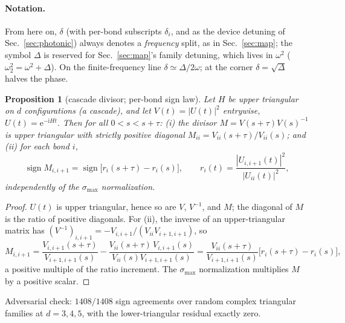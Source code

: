 ﻿\documentclass[11pt]{article}
\newcommand{\ee}{\mathrm{e}}
\newcommand{\ii}{\mathrm{i}}
\newtheorem{proposition}{Proposition}
\theoremstyle{remark}
\begin{document}
\paragraph{Notation.} From here on, $\delta$ (with per-bond
subscripts $\delta_i$, and as the device detuning of
Sec.~\ref{sec:photonic}) always denotes a \emph{frequency} split,
as in Sec.~\ref{sec:map}; the symbol $\Delta$ is reserved for
Sec.~\ref{sec:map}'s family detuning, which lives in $\omega^2$
($\omega_2^2=\omega^2+\Delta$). On the finite-frequency line
$\delta\simeq\Delta/2\omega$; at the corner $\delta=\sqrt\Delta$
halves the phase.

\begin{proposition}[cascade divisor; per-bond sign law]
\label{prop:signlaw}
Let $H$ be upper triangular on $d$ configurations (a cascade), and
let $V(t)=|U(t)|^2$ entrywise, $U(t)=\ee^{-\ii Ht}$. Then for all
$0<s<s+\tau$: (i) the divisor $M=V(s+\tau)V(s)^{-1}$ is upper
triangular with strictly positive diagonal
$M_{ii}=V_{ii}(s{+}\tau)/V_{ii}(s)$; and (ii) for each bond $i$,
\[
\operatorname{sign} M_{i,i+1}
=\operatorname{sign}\bigl[r_i(s+\tau)-r_i(s)\bigr],
\qquad
r_i(t)=\frac{|U_{i,i+1}(t)|^2}{|U_{ii}(t)|^2},
\]
independently of the $\sigma_{\max}$ normalization.
\end{proposition}

\begin{proof}
$U(t)$ is upper triangular, hence so are $V$, $V^{-1}$, and $M$;
the diagonal of $M$ is the ratio of positive diagonals. For (ii),
the inverse of an upper-triangular matrix has
$(V^{-1})_{i,i+1}=-V_{i,i+1}/(V_{ii}V_{i+1,i+1})$, so
\[
M_{i,i+1}
=\frac{V_{i,i+1}(s{+}\tau)}{V_{i+1,i+1}(s)}
-\frac{V_{ii}(s{+}\tau)\,V_{i,i+1}(s)}{V_{ii}(s)V_{i+1,i+1}(s)}
=\frac{V_{ii}(s{+}\tau)}{V_{i+1,i+1}(s)}
\bigl[r_i(s{+}\tau)-r_i(s)\bigr],
\]
a positive multiple of the ratio increment. The $\sigma_{\max}$
normalization multiplies $M$ by a positive scalar.
\end{proof}

Adversarial check: $1408/1408$ sign agreements over random complex
triangular families at $d=3,4,5$, with the lower-triangular
residual exactly zero.
\end{document}
